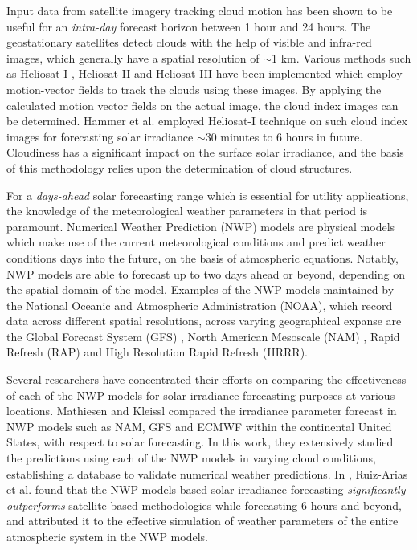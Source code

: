 \restoregeometry

\par Input data from satellite imagery tracking cloud motion has been shown to be useful for an \textit{intra-day} forecast horizon between 1 hour and 24 hours. The geostationary satellites detect clouds with the help of visible and infra-red images, which generally have a spatial resolution of $\sim$1 km. Various methods such as Heliosat-I \cite{litrev_sat1}, Heliosat-II \cite{litrev_sat2} and Heliosat-III \cite{litrev_sat3} have been implemented which employ motion-vector fields to track the clouds using these images. By applying the calculated motion vector fields on the actual image, the cloud index images can be determined. Hammer et al. \cite{litrev_sat4} employed Heliosat-I technique on such cloud index images for forecasting solar irradiance $\sim$30 minutes to 6 hours in future. Cloudiness has a significant impact on the surface solar irradiance, and the basis of this methodology relies upon the determination of cloud structures.

\par For a \textit{days-ahead} solar forecasting range which is essential for utility applications, the knowledge of the meteorological weather parameters in that period is paramount. Numerical Weather Prediction (NWP) models are physical models which make use of the current meteorological conditions and predict weather conditions days into the future, on the basis of atmospheric equations. Notably, NWP models are able to forecast up to two days ahead or beyond, depending on the spatial domain of the model. Examples of the NWP models maintained by the National Oceanic and Atmospheric Administration (NOAA), which record data across different spatial resolutions, across varying geographical expanse are the Global Forecast System (GFS) \cite{litrev_nwp_gfs}, North American Mesoscale (NAM) \cite{litrev_nwp_nam}, Rapid Refresh (RAP) and High Resolution Rapid Refresh (HRRR).

\par Several researchers have concentrated their efforts on comparing the effectiveness of each of the NWP models for solar irradiance forecasting purposes at various locations. Mathiesen and Kleissl \cite{litrev_nwp1} compared the irradiance parameter forecast in NWP models such as NAM, GFS and ECMWF within the continental United States, with respect to solar forecasting. In this work, they extensively studied the predictions using each of the NWP models in varying cloud conditions, establishing a database to validate numerical weather predictions. In \cite{litrev_nwp2}, Ruiz-Arias et al. found that the NWP models based solar irradiance forecasting \textit{significantly outperforms} satellite-based methodologies while forecasting 6 hours and beyond, and attributed it to the effective simulation of weather parameters of the entire atmospheric system in the NWP models.

